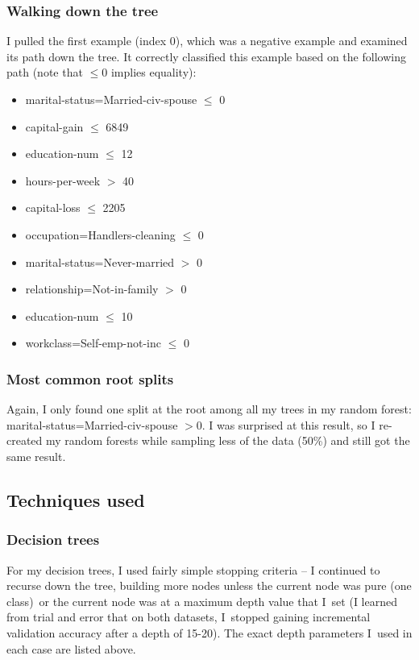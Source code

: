 \documentclass{report}
\begin{document}
\subsubsection{Walking down the tree}

I pulled the first example (index 0), which was a negative example and examined
its path down the tree. It correctly classified this example based on the
following path (note that $\leq0$ implies equality):

\begin{itemize}
\item marital-status=Married-civ-spouse $\leq$ 0
\item capital-gain $\leq$ 6849
\item education-num $\leq$ 12
\item hours-per-week $>$ 40
\item capital-loss $\leq$ 2205
\item occupation=Handlers-cleaning $\leq$ 0
\item marital-status=Never-married $>$ 0
\item relationship=Not-in-family $>$ 0
\item education-num $\leq$ 10
\item workclass=Self-emp-not-inc $\leq$ 0
\end{itemize}

\subsubsection{Most common root splits}
Again, I only found one split at the root among all my trees in my random
forest: marital-status=Married-civ-spouse $>0$. I was surprised at this result, so I re-created my random
forests while sampling less of the data (50\%) and still got the same
result.

\subsection*{Techniques used}
\subsubsection{Decision trees}
For my decision trees, I used fairly simple stopping criteria -- I continued to recurse down the tree, building more nodes unless the current node was pure (one class)\ or the current node was at a maximum depth value that I\ set (I learned from trial and error that on both datasets, I\ stopped gaining incremental validation accuracy after a depth of 15-20). The exact depth parameters I\ used in each case are listed above. \newline
\end{document}

